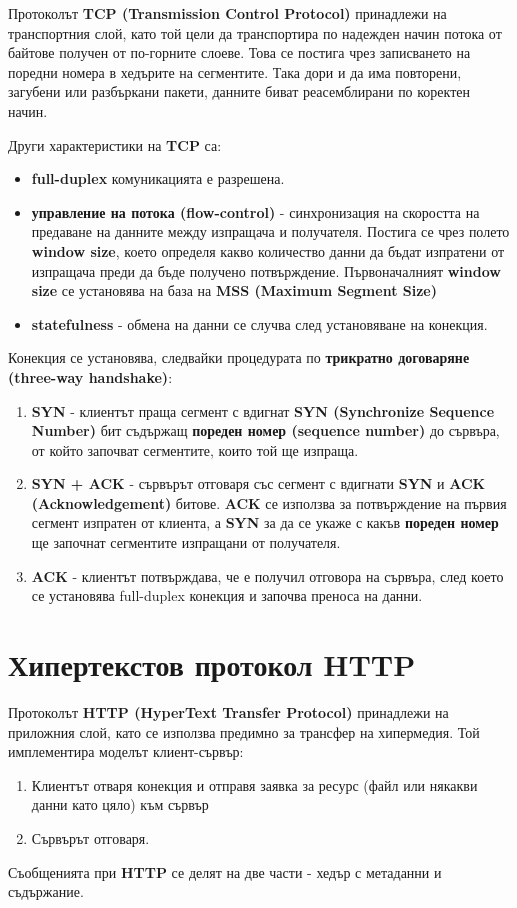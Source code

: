 \documentclass[fleqn,12pt]{article}
\begin{document}
\begin{flushleft}
Протоколът \textbf{TCP (Transmission Control Protocol)} принадлежи на транспортния слой, като той цели да транспортира по надежден начин потока от байтове получен от по-горните слоеве.
Това се постига чрез записването на поредни номера в хедърите на сегментите. Така дори и да има повторени, загубени или разбъркани пакети, данните биват реасемблирани по коректен начин.

Други характеристики на \textbf{TCP} са:
\begin{itemize}
    \item \textbf{full-duplex} комуникацията е разрешена.
    \item \textbf{управление на потока (flow-control)} - синхронизация на скоростта на предаване на данните между изпращача и получателя.
    Постига се чрез полето \textbf{window size}, което определя какво количество данни да бъдат изпратени от изпращача преди да бъде получено потвърждение.
    Първоначалният \textbf{window size} се установява на база на \textbf{MSS (Maximum Segment Size)}
    \item \textbf{statefulness} - обмена на данни се случва след установяване на конекция.
\end{itemize} 

Конекция се установява, следвайки процедурата по \textbf{трикратно договаряне (three-way handshake)}:
\begin{enumerate}
    \item \textbf{SYN} - клиентът праща сегмент с вдигнат \textbf{SYN (Synchronize Sequence Number)} бит съдържащ \textbf{пореден номер (sequence number)} до сървъра, от който започват сегментите, които той ще изпраща.
    \item \textbf{SYN + ACK} - сървърът отговаря със сегмент с вдигнати \textbf{SYN} и \textbf{ACK (Acknowledgement)} битове.
    \textbf{ACK} се използва за потвърждение на първия сегмент изпратен от клиента, а \textbf{SYN} за да се укаже с какъв \textbf{пореден номер} ще започнат сегментите изпращани от получателя.
    \item \textbf{ACK} - клиентът потвърждава, че е получил отговора на сървъра, след което се установява full-duplex конекция и започва преноса на данни.
\end{enumerate}

\section{Хипертекстов протокол HTTP}

Протоколът \textbf{HTTP (HyperText Transfer Protocol)} принадлежи на приложния слой, като се използва предимно за трансфер на хипермедия.
Той имплементира моделът клиент-сървър:
\begin{enumerate}
    \item Клиентът отваря конекция и отправя заявка за ресурс (файл или някакви данни като цяло) към сървър
    \item Сървърът отговаря.
\end{enumerate}
Съобщенията при \textbf{HTTP} се делят на две части - хедър с метаданни и съдържание.


\end{flushleft}
\end{document}
